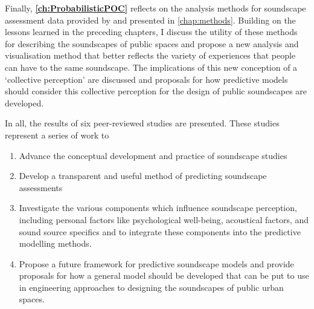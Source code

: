 Finally, \textbf{\cref{ch:ProbabilisticPOC}} reflects on the analysis methods for soundscape assessment data provided by \citet{ISO12913Part2} and presented in \cref{chap:methods}. Building on the lessons learned in the preceding chapters, I discuss the utility of these methods for describing the soundscapes of public spaces and propose a new analysis and visualisation method that better reflects the variety of experiences that people can have to the same soundscape. The implications of this new conception of a `collective perception' are discussed and proposals for how predictive models should consider this collective perception for the design of public soundscapes are developed.

In all, the results of six peer-reviewed studies are presented. These studies represent a series of work to

\begin{enumerate}
  \item Advance the conceptual development and practice of soundscape studies
  \item Develop a transparent and useful method of predicting soundscape assessments
  \item Investigate the various components which influence soundscape perception, including personal factors like psychological well-being, acoustical factors, and sound source specifics and to integrate these components into the predictive modelling methods.
  \item Propose a future framework for predictive soundscape models and provide proposals for how a general model should be developed that can be put to use in engineering approaches to designing the soundscapes of public urban spaces. 
\end{enumerate}
